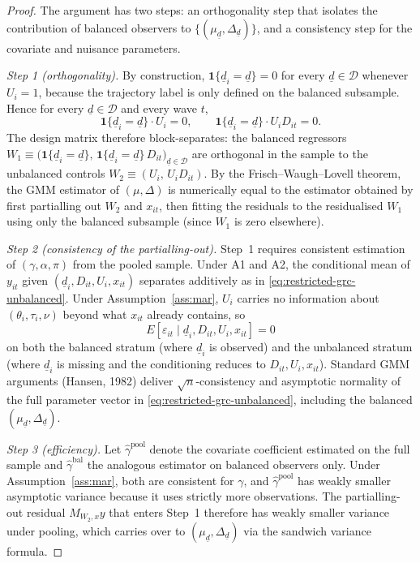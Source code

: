 \begin{proof}
The argument has two steps: an orthogonality step that isolates the
contribution of balanced observers to
$\{(\mu_{\underline d},\Delta_{\underline d})\}$, and a consistency
step for the covariate and nuisance parameters.

\emph{Step 1 (orthogonality).}
By construction, $\mathbf{1}\{\underline d_i=\underline d\}=0$ for
every $\underline d\in\mathcal{D}$ whenever $U_i=1$, because the
trajectory label is only defined on the balanced subsample. Hence for
every $\underline d\in\mathcal{D}$ and every wave $t$,
\begin{equation*}
\mathbf{1}\{\underline d_i=\underline d\}\cdot U_i = 0,
\qquad
\mathbf{1}\{\underline d_i=\underline d\}\cdot U_i D_{it} = 0.
\end{equation*}
The design matrix therefore block-separates: the balanced regressors
$W_1 \equiv \bigl(\mathbf{1}\{\underline d_i=\underline d\},\,
\mathbf{1}\{\underline d_i=\underline d\}\, D_{it}\bigr)_{\underline
d\in\mathcal{D}}$ are orthogonal in the sample to the unbalanced
controls $W_2\equiv(U_i,\, U_i D_{it})$. By the
Frisch--Waugh--Lovell theorem, the GMM estimator of
$(\mu,\Delta)$ is numerically equal to the estimator obtained by
first partialling out $W_2$ and $x_{it}$, then fitting the residuals
to the residualised $W_1$ using only the balanced subsample (since
$W_1$ is zero elsewhere).

\emph{Step 2 (consistency of the partialling-out).}
Step~1 requires consistent estimation of $(\gamma,\alpha,\pi)$ from
the pooled sample. Under A1 and A2, the conditional mean of $y_{it}$
given $(\underline d_i,D_{it},U_i,x_{it})$ separates additively as in
\eqref{eq:restricted-grc-unbalanced}. Under Assumption~\ref{ass:mar},
$U_i$ carries no information about $(\theta_i,\tau_i,\nu)$ beyond
what $x_{it}$ already contains, so
\begin{equation*}
E[\varepsilon_{it}\mid\underline d_i, D_{it}, U_i, x_{it}]
= 0
\end{equation*}
on both the balanced stratum (where $\underline d_i$ is observed) and
the unbalanced stratum (where $\underline d_i$ is missing and the
conditioning reduces to $D_{it}, U_i, x_{it}$). Standard GMM
arguments (Hansen, 1982) deliver $\sqrt{n}$-consistency and
asymptotic normality of the full parameter vector in
\eqref{eq:restricted-grc-unbalanced}, including the balanced
$(\mu_{\underline d},\Delta_{\underline d})$.

\emph{Step 3 (efficiency).}
Let $\hat\gamma^{\mathrm{pool}}$ denote the covariate coefficient
estimated on the full sample and $\hat\gamma^{\mathrm{bal}}$ the
analogous estimator on balanced observers only. Under
Assumption~\ref{ass:mar}, both are consistent for $\gamma$, and
$\hat\gamma^{\mathrm{pool}}$ has weakly smaller asymptotic variance
because it uses strictly more observations. The partialling-out
residual $M_{W_2,x}y$ that enters Step~1 therefore has weakly smaller
variance under pooling, which carries over to
$(\mu_{\underline d},\Delta_{\underline d})$ via the sandwich variance
formula.
\end{proof}


